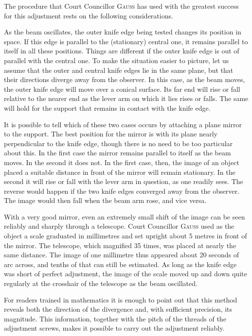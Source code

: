 The procedure that Court Councillor \textsc{Gauss} has used with the greatest success for this adjustment rests on the following considerations.

As the beam oscillates, the outer knife edge being tested changes its position in space. If this edge is parallel to the (stationary) central one, it remains parallel to itself in all these positions. Things are different if the outer knife edge is out of parallel with the central one. To make the situation easier to picture, let us assume that the outer and central knife edges lie in the same plane, but that their directions diverge away from the observer. In this case, as the beam moves, the outer knife edge will move over a conical surface. Its far end will rise or fall relative to the nearer end as the lever arm on which it lies rises or falls. The same will hold for the support that remains in contact with the knife edge.

It is possible to tell which of these two cases occurs by attaching a plane mirror to the support. The best position for the mirror is with its plane nearly perpendicular to the knife edge, though there is no need to be too particular about this. In the first case the mirror remains parallel to itself as the beam moves. In the second it does not. In the first case, then, the image of an object placed a suitable distance in front of the mirror will remain stationary. In the second it will rise or fall with the lever arm in question, as one readily sees. The reverse would happen if the two knife edges converged away from the observer. The image would then fall when the beam arm rose, and vice versa.

With a very good mirror, even an
extremely small shift of the image can be seen reliably and sharply through a telescope. Court Councillor \textsc{Gauss} used as the object a scale graduated in millimetres and set upright about 5 metres in front of the mirror. The telescope, which magnified 35 times, was placed at nearly the same distance. The image of one millimetre thus appeared about 20 seconds of arc across, and tenths of that can still be estimated. As long as the knife edge was short of perfect adjustment, the image of the scale moved up and down quite regularly at the crosshair of the telescope as the beam oscillated.

For readers trained in mathematics it is enough to point out that this method reveals both the direction of the divergence and, with sufficient precision, its magnitude. This information, together with the pitch of the threads of the adjustment screws, makes it possible to carry out the adjustment reliably.

